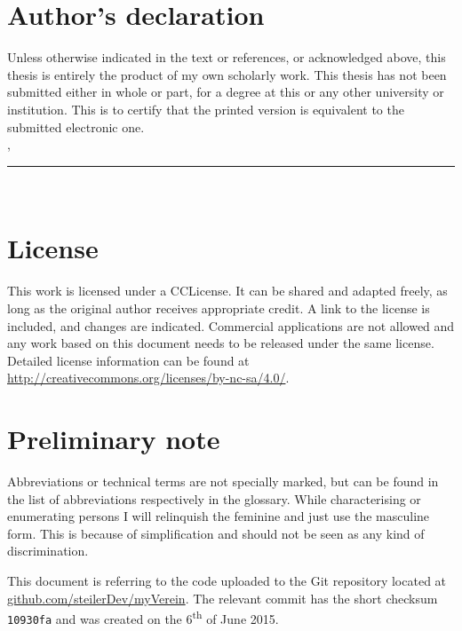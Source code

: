 \thispagestyle{empty}

\section*{Author's declaration}
\vspace*{1em}
Unless otherwise indicated in the text or references, or acknowledged above, this thesis is entirely the product of my own scholarly work. This thesis has not been submitted either in whole or part, for a degree at this or any other university or institution. This is to certify that the printed version is equivalent to the submitted electronic one.
\vspace{2em}\\
\abgabeort, \datumAbgabe
\vspace{3em}\\
\rule{6cm}{0.4pt}\\
\autor
\vspace*{1.5em}

\section*{License}

\vspace*{1.5em}
This work is licensed under a \acrfull{CCLicense}. It can be shared and adapted freely, as long as the original author receives appropriate credit. A link to the license is included, and changes are indicated. Commercial applications are not allowed and any work based on this document needs to be released under the same license. Detailed license information can be found at \url{http://creativecommons.org/licenses/by-nc-sa/4.0/}.
\vspace{1.5em}

\section*{Preliminary note}

\vspace*{1.5em}
Abbreviations or technical terms are not specially marked, but can be found in the list of abbreviations respectively in the glossary. While characterising or enumerating persons I will relinquish the feminine and just use the masculine form. This is because of simplification and should not be seen as any kind of discrimination. 

This document is referring to the code uploaded to the Git repository located at \url{github.com/steilerDev/myVerein}. The relevant commit has the short checksum \texttt{10930fa} and was created on the 6\textsuperscript{th} of June 2015.
